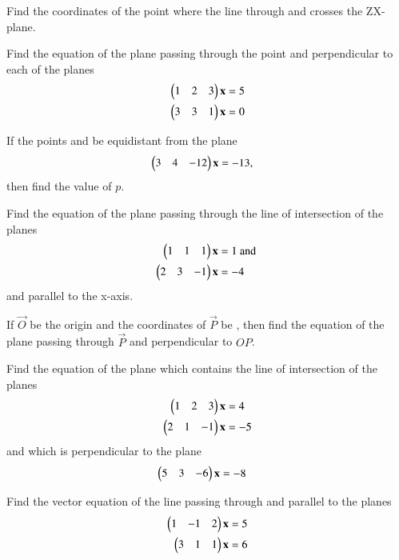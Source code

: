 \item Find the coordinates of the point where the line through  and  crosses the ZX-plane.
\item Find the equation of the plane passing through the point  and perpendicular to each of the planes 
\begin{align}
\begin{pmatrix}1 & 2 & 3\end{pmatrix}\mathbf{x}&=5
\\
\begin{pmatrix}3 & 3 & 1\end{pmatrix}\mathbf{x}&=0
\end{align}
\item If the points  and  be equidistant from the plane 
\begin{align}
\begin{pmatrix}3 & 4 & -12\end{pmatrix}\mathbf{x}&=-13,
\end{align}
%
then find the value of $p$.
\item Find the equation of the plane passing through the line of intersection of the planes 
\begin{align}
\begin{pmatrix}1 & 1 & 1\end{pmatrix}\mathbf{x}&=1 \text{ and }
\\
\begin{pmatrix}2 & 3 & -1\end{pmatrix}\mathbf{x}&=-4
\end{align}
%
and parallel to the x-axis.
\item If $\vec{O}$ be the origin and the coordinates of $\vec{P}$ be , then find the equation of the plane passing through $\vec{P}$ and perpendicular to $OP$.
%
\item Find the equation of the plane which contains the line of intersection of the planes 
%
\begin{align}
\begin{pmatrix}1 & 2 & 3\end{pmatrix}\mathbf{x}&=4 
\\
\begin{pmatrix}2 & 1 & -1\end{pmatrix}\mathbf{x}&=-5
\end{align}
%
and which is perpendicular to the plane 
\begin{align}
\begin{pmatrix}5 & 3 & -6\end{pmatrix}\mathbf{x}&=-8
\end{align}
%
\item Find the vector equation of the line passing through  and parallel to the planes 
%
\begin{align}
\begin{pmatrix}1 & -1 & 2\end{pmatrix}\mathbf{x}&=5
\\
\begin{pmatrix}3 & 1 & 1\end{pmatrix}\mathbf{x}&=6
\end{align}
%

